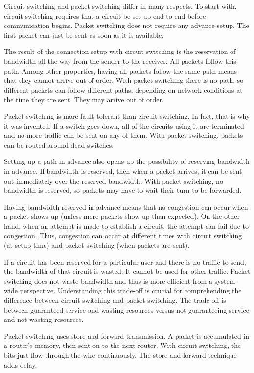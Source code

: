 Circuit switching and packet switching differ in many respects. To start
with, circuit switching requires that a circuit be set up end to end
before communication begins. Packet switching does not require any
advance setup. The first packet can just be sent as soon as it is
available.

The result of the connection setup with circuit switching is the
reservation of bandwidth all the way from the sender to the receiver.
All packets follow this path. Among other properties, having all packets
follow the same path means that they cannot arrive out of order. With
packet switching there is no path, so different packets can follow
different paths, depending on network conditions at the time they are
sent. They may arrive out of order.

Packet switching is more fault tolerant than circuit switching. In fact,
that is why it was invented. If a switch goes down, all of the circuits
using it are terminated and no more traffic can be sent on any of them.
With packet switching, packets can be routed around dead switches.

Setting up a path in advance also opens up the possibility of reserving
bandwidth in advance. If bandwidth is reserved, then when a packet
arrives, it can be sent out immediately over the reserved bandwidth.
With packet switching, no bandwidth is reserved, so packets may have to
wait their turn to be forwarded.

Having bandwidth reserved in advance means that no congestion can occur
when a packet shows up (unless more packets show up than expected). On
the other hand, when an attempt is made to establish a circuit, the
attempt can fail due to congestion. Thus, congestion can occur at
different times with circuit switching (at setup time) and packet
switching (when packets are sent).

If a circuit has been reserved for a particular user and there is no
traffic to send, the bandwidth of that circuit is wasted. It cannot be
used for other traffic. Packet switching does not waste bandwidth and
thus is more efficient from a system-wide perspective. Understanding
this trade-off is crucial for comprehending the difference between
circuit switching and packet switching. The trade-off is between
guaranteed service and wasting resources versus not guaranteeing service
and not wasting resources.

Packet switching uses store-and-forward transmission. A packet is
accumulated in a router's memory, then sent on to the next router. With
circuit switching, the bits just flow through the wire continuously. The
store-and-forward technique adds delay.

